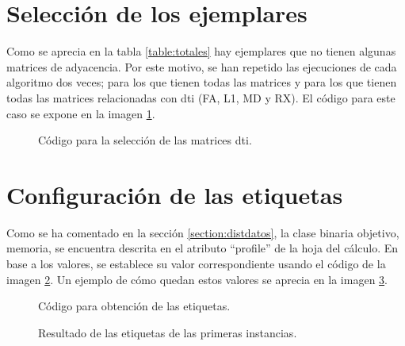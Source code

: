 \section{Selección de los ejemplares}
Como se aprecia en la tabla \ref{table:totales} hay ejemplares que no tienen algunas matrices de adyacencia. Por este motivo, se han repetido las ejecuciones de cada algoritmo dos veces; para los que tienen todas las matrices y para los que tienen todas las matrices relacionadas con \gls{dti} (FA, L1, MD y RX). El código para este caso se expone en la imagen \ref{figure:codeselect}.

\begin{figure}[H]
\centering
{}
\caption{Código para la selección de las matrices \gls{dti}.}
\label{figure:codeselect}
\end{figure}


\section{Configuración de las etiquetas}
Como se ha comentado en la sección \ref{section:distdatos}, la clase binaria objetivo, memoria, se encuentra descrita en el atributo ``profile'' de la hoja del cálculo. En base a los valores, se establece su valor correspondiente usando el código de la imagen \ref{figure:codelabel}. Un ejemplo de cómo quedan estos valores se aprecia en la imagen \ref{figure:outlabel}.

\begin{figure}[H]
\centering
{}
\caption{Código para obtención de las etiquetas.}
\label{figure:codelabel}
\end{figure}

\begin{figure}[H]
\centering
{}
\caption{Resultado de las etiquetas de las primeras instancias.}
\label{figure:outlabel}
\end{figure}


